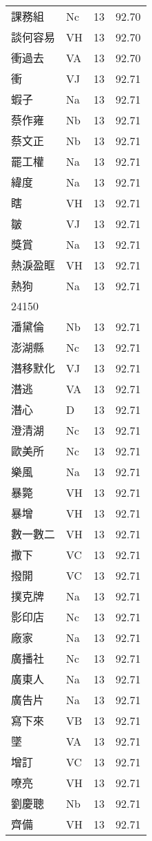 \documentclass[twocolumn]{book}
\begin{document}
\begin{supertabular}{llrr}
課務組 & Nc & 13 &  92.70\\
談何容易 & VH & 13 &  92.70\\
衝過去 & VA & 13 &  92.70\\
衝 & VJ & 13 &  92.71\\
蝦子 & Na & 13 &  92.71\\
蔡作雍 & Nb & 13 &  92.71\\
蔡文正 & Nb & 13 &  92.71\\
罷工權 & Na & 13 &  92.71\\
緯度 & Na & 13 &  92.71\\
瞎 & VH & 13 &  92.71\\
皺 & VJ & 13 &  92.71\\
獎賞 & Na & 13 &  92.71\\
熱淚盈眶 & VH & 13 &  92.71\\
熱狗 & Na & 13 &  92.71\\
24150\\
潘黛倫 & Nb & 13 &  92.71\\
澎湖縣 & Nc & 13 &  92.71\\
潛移默化 & VJ & 13 &  92.71\\
潛逃 & VA & 13 &  92.71\\
潛心 & D & 13 &  92.71\\
澄清湖 & Nc & 13 &  92.71\\
歐美所 & Nc & 13 &  92.71\\
樂風 & Na & 13 &  92.71\\
暴斃 & VH & 13 &  92.71\\
暴增 & VH & 13 &  92.71\\
數一數二 & VH & 13 &  92.71\\
撒下 & VC & 13 &  92.71\\
撥開 & VC & 13 &  92.71\\
撲克牌 & Na & 13 &  92.71\\
影印店 & Nc & 13 &  92.71\\
廠家 & Na & 13 &  92.71\\
廣播社 & Nc & 13 &  92.71\\
廣東人 & Na & 13 &  92.71\\
廣告片 & Na & 13 &  92.71\\
寫下來 & VB & 13 &  92.71\\
墜 & VA & 13 &  92.71\\
增訂 & VC & 13 &  92.71\\
嘹亮 & VH & 13 &  92.71\\
劉慶聰 & Nb & 13 &  92.71\\
齊備 & VH & 13 &  92.71\\

\end{supertabular}
\end{document}

